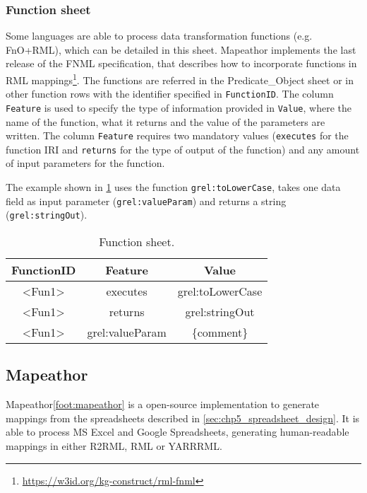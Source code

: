 \subsubsection{Function sheet} Some languages are able to process data transformation functions  (e.g. FnO+RML), which can be detailed in this sheet. Mapeathor implements the last release of the FNML specification, that describes how to incorporate functions in RML mappings\footnote{\url{https://w3id.org/kg-construct/rml-fnml}}. The functions are referred in the Predicate\_Object sheet or in other function rows with the identifier specified in \texttt{FunctionID}. The column \texttt{Feature} is used to specify the type of information provided in \texttt{Value}, where the name of the function, what it returns and the value of the parameters are written. The column \texttt{Feature} requires two mandatory values (\texttt{executes} for the function IRI and \texttt{returns} for the type of output of the function) and any amount of input parameters for the function. 

The example shown in \cref{tab:function_sheet} uses the function \texttt{grel:toLowerCase},  takes one data field as input parameter (\texttt{grel:valueParam}) and returns a string (\texttt{grel:stringOut}).

\begin{table}[h!]
\caption{Function sheet.}
\label{tab:function_sheet}
\centering
\begin{tabular}{c|c|c}
\midrule
\textbf{FunctionID} & \textbf{Feature} & \textbf{Value} \\ \midrule
\textless{}Fun1\textgreater{} & executes & grel:toLowerCase \\  
\textless{}Fun1\textgreater{} & returns & grel:stringOut \\  
\textless{}Fun1\textgreater{} & grel:valueParam & \{comment\} \\
\midrule
\end{tabular}
\end{table}


\subsection{Mapeathor}

Mapeathor\cref{foot:mapeathor} is a open-source implementation to generate mappings from the spreadsheets described in \cref{sec:chp5_spreadsheet_design}. It is able to process MS Excel and Google Spreadsheets, generating human-readable mappings in either R2RML, RML or YARRRML. 


